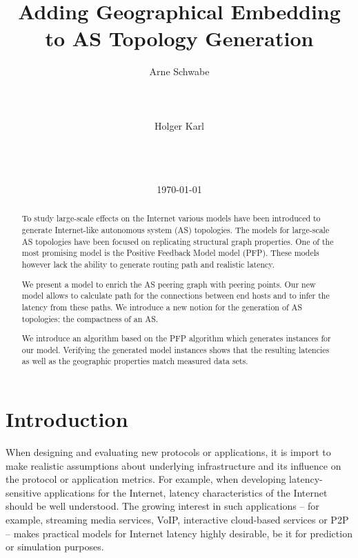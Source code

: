 \documentclass{sig-alternate-10pt}
\begin{document}
\title{Adding Geographical Embedding to AS Topology Generation}
 \author{
\alignauthor
Arne Schwabe\\
\\
\\
\\
\alignauthor
Holger Karl\\
\\
\\
\\
}
\date{\today}



 \maketitle
{}
\overfullrule=1mm

\begin{abstract}
To study large-scale effects on the Internet various models have been introduced to generate Internet-like autonomous system (AS) topologies. The models for large-scale AS topologies have been focused on replicating structural graph properties. One of the most promising model is the Positive Feedback Model model (PFP). These models however lack the ability to generate routing path and realistic latency. 

We present a model to enrich the AS peering graph with peering points. Our new model allows to calculate path for the connections between end hosts and to infer the latency from these paths. We introduce a new notion for the generation of AS topologies: the compactness of an AS. 

We introduce an algorithm based on the PFP algorithm which generates instances for our model. Verifying the generated model instances shows that the resulting latencies as well as the geographic properties match measured data sets. 
\end{abstract}


\section{Introduction}
\label{sec:introduction}

When designing and evaluating new protocols or applications, it is
import to make realistic assumptions about underlying
infrastructure and its influence on the protocol or application
metrics. For example, when developing latency-sensitive applications
for the Internet, latency characteristics of the Internet should be
well understood. The growing interest in such applications -- for
example, streaming media services, VoIP, interactive cloud-based
services or P2P -- makes practical models for Internet latency highly
desirable, be it for prediction or simulation purposes. 
\end{document}
